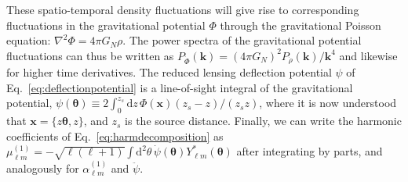 \documentclass[twocolumn]{aastex63}
\newcommand{\vect}[1]{\boldsymbol{\mathbf{#1}}}
\newcommand{\dd}{\mathrm{d}}
\begin{document}
These spatio-temporal density fluctuations will give rise to corresponding fluctuations in the gravitational potential $\Phi$ through the gravitational Poisson equation: $\nabla^2 \Phi = 4 \pi G_N \rho$. The power spectra of the gravitational potential fluctuations can thus be written as $P_{\dot{\Phi}}(\vect{k}) = (4\pi G_N)^2 P_{\dot{\rho}}(\vect{k})/\vect{k}^4$ and likewise for higher time derivatives. The reduced lensing deflection potential $\psi$ of Eq.~\ref{eq:deflectionpotential} is a line-of-sight integral of the gravitational potential, $\psi(\vect{\theta}) \equiv 2 \int_0^{z_s} \dd z \, \Phi(\vect{x}) (z_s - z)/(z_s z)$, where it is now understood that $\vect{x} = \lbrace z \vect{\theta},z\rbrace$, and $z_s$ is the source distance. Finally, we can write the harmonic coefficients of Eq.~\ref{eq:harmdecomposition} as $\mu_{\ell m}^{(1)} = - \sqrt{\ell(\ell+1)} \int \dd^2\theta\, \dot{\psi}(\vect{\theta}) Y_{\ell m}^*(\vect{\theta})$ after integrating by parts, and analogously for $\alpha_{\ell m}^{(1)}$ and $\ddot{\psi}$.
\end{document}

